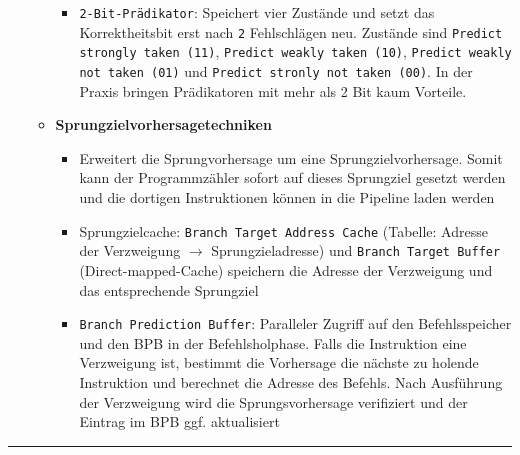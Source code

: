 \begin{itemize}
\begin{itemize}
\begin{itemize}
						\item \texttt{2-Bit-Prädikator}: Speichert vier Zustände und setzt das Korrektheitsbit erst nach \texttt{2} Fehlschlägen neu. Zustände sind \texttt{Predict strongly taken (11)}, \texttt{Predict weakly taken (10)}, \texttt{Predict weakly not taken (01)} und \texttt{Predict stronly not taken (00)}. In der Praxis bringen Prädikatoren mit mehr als 2 Bit kaum Vorteile.
					\end{itemize}
					\item \textbf{Sprungzielvorhersagetechniken}
					\begin{itemize}
						\item Erweitert die Sprungvorhersage um eine Sprungzielvorhersage. Somit kann der Programmzähler sofort auf dieses Sprungziel gesetzt werden und die dortigen Instruktionen können in die Pipeline laden werden
						\item Sprungzielcache: \texttt{Branch Target Address Cache} (Tabelle: Adresse der Verzweigung \(\rightarrow\) Sprungzieladresse) und \texttt{Branch Target Buffer} (Direct-mapped-Cache) speichern die Adresse der Verzweigung und das entsprechende Sprungziel
						\item \texttt{Branch Prediction Buffer}: Paralleler Zugriff auf den Befehlsspeicher und den BPB in der Befehlsholphase. Falls die Instruktion eine Verzweigung ist, bestimmt die Vorhersage die nächste zu holende Instruktion und berechnet die Adresse des Befehls. Nach Ausführung der Verzweigung wird die Sprungsvorhersage verifiziert und der Eintrag im BPB ggf. aktualisiert
					\end{itemize}
				\end{itemize}
			\end{itemize}
		\par\noindent\rule{\textwidth}{0.4pt}

